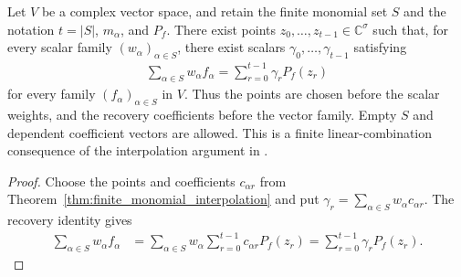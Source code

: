\begin{theorem}
    \label{thm:weighted_monomial_recovery}
    \leanok
    Let $V$ be a complex vector space, and retain the finite monomial set
    $S$ and the notation $t=|S|$, $m_\alpha$, and $P_f$.
    There exist points $z_0,\ldots,z_{t-1}\in\mathbb C^\sigma$ such that,
    for every scalar family $(w_\alpha)_{\alpha\in S}$, there exist scalars
    $\gamma_0,\ldots,\gamma_{t-1}$ satisfying
    \begin{align*}
        \sum_{\alpha\in S} w_\alpha f_\alpha
        =\sum_{r=0}^{t-1}\gamma_r P_f(z_r)
    \end{align*}
    for every family $(f_\alpha)_{\alpha\in S}$ in $V$.
    Thus the points are chosen before the scalar weights, and the recovery
    coefficients before the vector family. Empty $S$ and dependent
    coefficient vectors are allowed. This is a finite linear-combination
    consequence of the interpolation argument in
    \cite[Lemma~4.2]{Arad2013AreaLaw}.
\end{theorem}
\begin{proof}\leanok
    Choose the points and coefficients $c_{\alpha r}$ from
    Theorem~\ref{thm:finite_monomial_interpolation} and put
    $\gamma_r=\sum_{\alpha\in S}w_\alpha c_{\alpha r}$.
    The recovery identity gives
    \begin{align*}
        \sum_{\alpha\in S}w_\alpha f_\alpha
         & =\sum_{\alpha\in S}w_\alpha
        \sum_{r=0}^{t-1}c_{\alpha r}P_f(z_r)
        =\sum_{r=0}^{t-1}\gamma_r P_f(z_r).
    \end{align*}
\end{proof}

